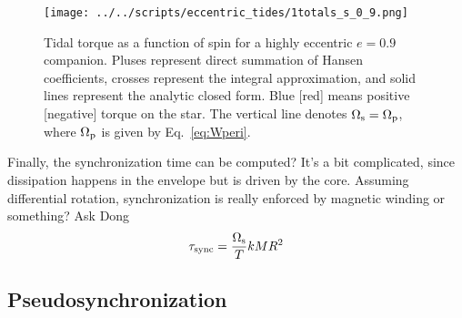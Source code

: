 \documentclass[
        fleqn,
        usenatbib,
    ]{mnras}
\begin{document}
\begin{figure}
    \centering
    \texttt{[image: ../../scripts/eccentric\_tides/1totals\_s\_0\_9.png]}
    \caption{Tidal torque as a function of spin for a highly eccentric $e = 0.9$
    companion. Pluses represent direct summation of Hansen coefficients, crosses
    represent the integral approximation, and solid lines represent the
    analytic closed form. Blue [red] means positive [negative]
    torque on the star. The vertical line denotes $\Omega_{\rm s} = \Omega_{\rm
    p}$, where $\Omega_{\rm p}$ is given by Eq.~\eqref{eq:Wperi}. }\label{fig:totals_s}
\end{figure}

\textcolor{Corr}{Finally, the synchronization time can be computed? It's a bit
complicated, since dissipation happens in the envelope but is driven by the
core. Assuming differential rotation, synchronization is really enforced by
magnetic winding or something? Ask Dong}
\begin{equation}
    \tau_{\rm sync} = \frac{\Omega_{\rm s}}{T}kMR^2
\end{equation}

\subsection{Pseudosynchronization}
\end{document}
